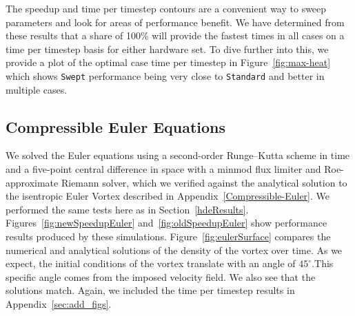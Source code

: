 \documentclass[mca,article,submit,moreauthors,pdftex]{Definitions/mdpi}
\def\Swept{\texttt{Swept}}
\def\Standard{\texttt{Standard}}
\begin{document}
\begin{paracol}{2}
\linenumbers
\switchcolumn

The speedup and time per timestep contours are a convenient way to sweep parameters and look for areas of performance benefit. We have determined from these results that a share of 100\% will provide the fastest times in all cases on a time per timestep basis for either hardware set. To dive further into this, we provide a plot of the optimal case time per timestep in Figure~\ref{fig:max-heat} which shows \Swept{} performance being very close to \Standard{} and better in multiple cases. 

\subsection{Compressible Euler Equations}
\label{eulerVortexResults}

We solved the Euler equations using a second-order Runge--Kutta scheme in time and a five-point central difference in space with a minmod flux limiter and Roe-approximate Riemann solver, which we verified against the analytical solution to the isentropic Euler Vortex described in Appendix~\ref{Compressible-Euler}. We performed the same tests here as in Section~\ref{hdeResults}. Figures~\ref{fig:newSpeedupEuler} and~\ref{fig:oldSpeedupEuler} show performance results produced by these simulations. Figure~\ref{fig:eulerSurface} compares the numerical and analytical solutions of the density of the vortex over time. 
As we expect, the initial conditions of the vortex translate with an angle of $45^\circ$.This specific angle comes from the imposed velocity field. 
We also see that the solutions match. Again, we included the time per timestep results in Appendix~\ref{sec:add_figs}.

\end{paracol}
\nointerlineskip
\end{document}
